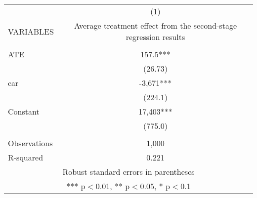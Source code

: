 \begin{tabular}{lc} \hline
 & (1) \\
VARIABLES & Average treatment effect from the second-stage regression results \\ \hline
 &  \\
ATE & 157.5*** \\
 & (26.73) \\
car & -3,671*** \\
 & (224.1) \\
Constant & 17,403*** \\
 & (775.0) \\
 &  \\
Observations & 1,000 \\
 R-squared & 0.221 \\ \hline
\multicolumn{2}{c}{ Robust standard errors in parentheses} \\
\multicolumn{2}{c}{ *** p$<$0.01, ** p$<$0.05, * p$<$0.1} \\
\end{tabular}
